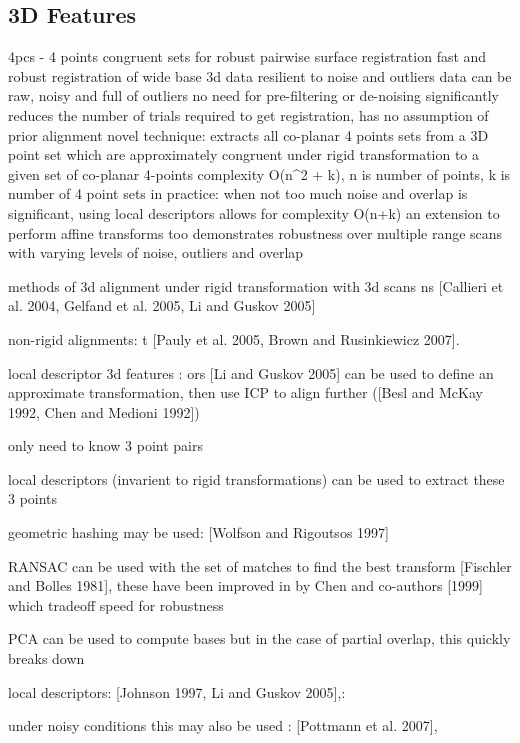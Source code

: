 \subsection{3D Features}

\cite{Aiger084}

4pcs - 4 points congruent sets for robust pairwise surface registration
fast and robust registration of wide base 3d data
resilient to noise and outliers
data can be raw, noisy and full of outliers
no need for pre-filtering or de-noising
significantly reduces the number of trials required to get registration, has no assumption of prior alignment
novel technique:
extracts all co-planar 4 points sets from a 3D point set which are approximately congruent under rigid transformation to a given set of co-planar 4-points
complexity O(n^2 + k), n is number of points, k is number of 4 point sets
in practice: when not too much noise and overlap is significant,
using local descriptors allows for complexity O(n+k)
an extension to perform affine transforms too
demonstrates robustness over multiple range scans with varying levels of noise, outliers and overlap


methods of 3d alignment under rigid transformation with 3d scans
ns [Callieri et al. 2004, Gelfand et al. 2005, Li and Guskov
2005]

non-rigid alignments:
t [Pauly et al. 2005, Brown and
Rusinkiewicz 2007].


local descriptor 3d features : ors [Li and Guskov 2005] can be used to define an approximate transformation, then use ICP to align further ([Besl and McKay 1992, Chen and Medioni 1992])

only need to know 3 point pairs

local descriptors (invarient to rigid transformations) can be used to extract these 3 points

geometric hashing may be used: [Wolfson and Rigoutsos 1997]

RANSAC can be used with the set of matches to find the best transform [Fischler and Bolles 1981], 
these have been improved in by Chen and co-authors [1999] which tradeoff speed for robustness

PCA can be used to compute bases but in the case of partial overlap, this quickly breaks down

local descriptors: [Johnson 1997, Li
and Guskov 2005],: 

under noisy conditions this may also be used : [Pottmann et al. 2007],











